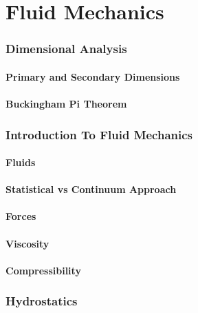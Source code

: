 \documentclass[11pt]{article}
\begin{document}
\part{Fluid Mechanics}
\section{Dimensional Analysis}
\subsection{Primary and Secondary Dimensions}
\subsection{Buckingham Pi Theorem}
\section{Introduction To Fluid Mechanics}
\subsection{Fluids}
\subsection{Statistical vs Continuum Approach}
\subsection{Forces}
\subsection{Viscosity}
\subsection{Compressibility}
\section{Hydrostatics}
\end{document}
